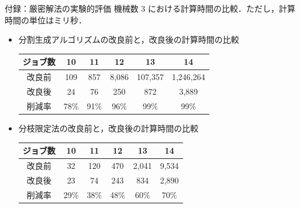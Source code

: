 \documentclass[dvipdfmx]{beamer}
\begin{document}
    \begin{frame}{付録：厳密解法の実験的評価}
      機械数 3 における計算時間の比較．ただし，計算時間の単位はミリ秒．
      \begin{itemize}
        \item 分割生成アルゴリズムの改良前と，改良後の計算時間の比較
        \begin{tabular}{|c|c|c|c|c|c|} \hline
          ジョブ数 & 10 & 11 & 12 & 13 & 14 \\ \hline \hline
          改良前 & 109 & 857 & 8,086 & 107,357 & 1,246,264\\ \hline
          改良後 & 24 & 76 & 250 & 872 & 3,889\\ \hline
          削減率 & 78\% & 91\% & 96\% & 99\% & \alert{99\%} \\ \hline
        \end{tabular}
        \item 分枝限定法の改良前と，改良後の計算時間の比較
        \begin{tabular}{|c|c|c|c|c|c|} \hline
          ジョブ数 & 10 & 11 & 12 & 13 & 14\\ \hline \hline
          改良前 & 32 & 120 & 470 & 2,041 & 9,534 \\ \hline
          改良後 & 23 & 74 & 243 & 834 & 2,890 \\ \hline
          削減率 & 29\% & 38\% & 48\% & 60\% & \alert{70\%} \\ \hline
        \end{tabular}
      \end{itemize}
    \end{frame}
\end{document}
